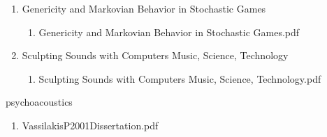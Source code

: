 \documentclass[11pt]{article}
\begin{document}
\begin{enumerate}
\item Genericity and Markovian Behavior in Stochastic Games
\label{sec-1-1-1-1-11-19-27-59}
\begin{enumerate}
\item Genericity and Markovian Behavior in Stochastic Games.pdf
\label{sec-1-1-1-1-11-19-27-59-1}
\end{enumerate}

\item Sculpting Sounds with Computers Music, Science, Technology
\label{sec-1-1-1-1-11-19-27-60}
\begin{enumerate}
\item Sculpting Sounds with Computers Music, Science, Technology.pdf
\label{sec-1-1-1-1-11-19-27-60-1}
\end{enumerate}
\end{enumerate}

\item psychoacoustics
\label{sec-1-1-1-1-11-19-28}
\begin{enumerate}
\item VassilakisP2001Dissertation.pdf
\label{sec-1-1-1-1-11-19-28-1}
\end{enumerate}
\end{document}
